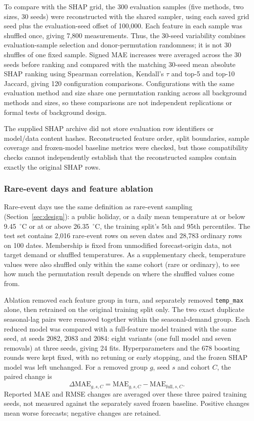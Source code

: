 \documentclass[11pt,a4paper]{article}
\newcommand{\feat}[1]{\texttt{#1}}
\begin{document}
To compare with the SHAP grid, the 300 evaluation samples (five methods, two sizes, 30 seeds) were reconstructed with the shared sampler, using each saved grid seed plus the evaluation-seed offset of 100{,}000. Each feature in each sample was shuffled once, giving 7{,}800 measurements. Thus, the 30-seed variability combines evaluation-sample selection and donor-permutation randomness; it is not 30 shuffles of one fixed sample. Signed MAE increases were averaged across the 30 seeds before ranking and compared with the matching 30-seed mean absolute SHAP ranking using Spearman correlation, Kendall's $\tau$ and top-5 and top-10 Jaccard, giving 120 configuration comparisons. Configurations with the same evaluation method and size share one permutation ranking across all background methods and sizes, so these comparisons are not independent replications or formal tests of background design.

The supplied SHAP archive did not store evaluation row identifiers or model/data content hashes. Reconstructed feature order, split boundaries, sample coverage and frozen-model baseline metrics were checked, but those compatibility checks cannot independently establish that the reconstructed samples contain exactly the original SHAP rows.

\subsubsection{Rare-event days and feature ablation}
Rare-event days use the same definition as rare-event sampling (Section~\ref{sec:design}): a public holiday, or a daily mean temperature at or below 9.45~$^\circ$C or at or above 26.35~$^\circ$C, the training split's 5th and 95th percentiles. The test set contains 2{,}016 rare-event rows on seven dates and 28{,}783 ordinary rows on 100 dates. Membership is fixed from unmodified forecast-origin data, not target demand or shuffled temperatures. As a supplementary check, temperature values were also shuffled only within the same cohort (rare or ordinary), to see how much the permutation result depends on where the shuffled values come from.

Ablation removed each feature group in turn, and separately removed \feat{temp\_max} alone, then retrained on the original training split only. The two exact duplicate seasonal-lag pairs were removed together within the seasonal-demand group. Each reduced model was compared with a full-feature model trained with the same seed, at seeds 2082, 2083 and 2084: eight variants (one full model and seven removals) at three seeds, giving 24 fits. Hyperparameters and the 678 boosting rounds were kept fixed, with no retuning or early stopping, and the frozen SHAP model was left unchanged. For a removed group $g$, seed $s$ and cohort $C$, the paired change is
\[
\Delta\mathrm{MAE}_{g,s,C}
=\mathrm{MAE}_{g,s,C}-\mathrm{MAE}_{\mathrm{full},s,C}.
\]
Reported MAE and RMSE changes are averaged over these three paired training seeds, not measured against the separately saved frozen baseline. Positive changes mean worse forecasts; negative changes are retained.
\end{document}
